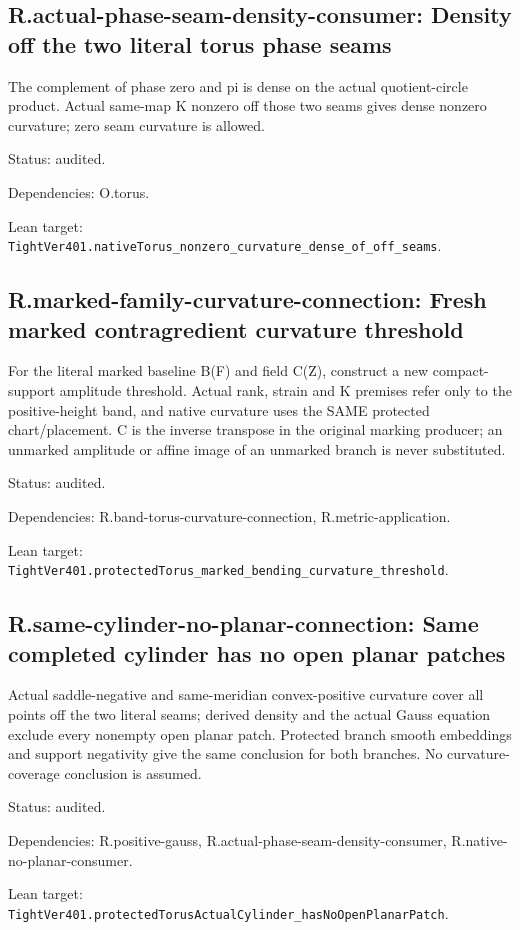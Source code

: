 \documentclass{article}
\begin{document}
\subsection*{R.actual-phase-seam-density-consumer: Density off the two literal torus phase seams}
The complement of phase zero and pi is dense on the actual quotient-circle product. Actual same-map K nonzero off those two seams gives dense nonzero curvature; zero seam curvature is allowed.
\par Status: audited.
\par Dependencies: O.torus.
\par Lean target: \texttt{TightVer401.nativeTorus\_nonzero\_curvature\_dense\_of\_off\_seams}.
\subsection*{R.marked-family-curvature-connection: Fresh marked contragredient curvature threshold}
For the literal marked baseline B(F) and field C(Z), construct a new compact-support amplitude threshold. Actual rank, strain and K premises refer only to the positive-height band, and native curvature uses the SAME protected chart/placement. C is the inverse transpose in the original marking producer; an unmarked amplitude or affine image of an unmarked branch is never substituted.
\par Status: audited.
\par Dependencies: R.band-torus-curvature-connection, R.metric-application.
\par Lean target: \texttt{TightVer401.protectedTorus\_marked\_bending\_curvature\_threshold}.
\subsection*{R.same-cylinder-no-planar-connection: Same completed cylinder has no open planar patches}
Actual saddle-negative and same-meridian convex-positive curvature cover all points off the two literal seams; derived density and the actual Gauss equation exclude every nonempty open planar patch. Protected branch smooth embeddings and support negativity give the same conclusion for both branches. No curvature-coverage conclusion is assumed.
\par Status: audited.
\par Dependencies: R.positive-gauss, R.actual-phase-seam-density-consumer, R.native-no-planar-consumer.
\par Lean target: \texttt{TightVer401.protectedTorusActualCylinder\_hasNoOpenPlanarPatch}.
\end{document}
